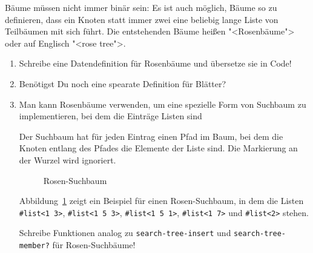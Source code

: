 \begin{aufgabe}
  Bäume müssen nicht immer binär sein: Es ist auch möglich, Bäume so
  zu definieren, dass ein Knoten statt immer zwei eine beliebig lange
  Liste von Teilbäumen mit sich führt.  Die entstehenden Bäume heißen
  "<Rosenbäume"> oder auf Englisch "<rose tree">.

  \begin{enumerate}
  \item Schreibe eine Datendefinition für Rosenbäume und übersetze sie
    in Code!
  \item Benötigst Du noch eine spearate Definition für Blätter?
  \item Man kann Rosenbäume verwenden, um eine spezielle Form von
    Suchbaum zu implementieren, bei dem die Einträge Listen sind

    Der Suchbaum hat für jeden Eintrag einen Pfad im Baum, bei dem die
    Knoten entlang des Pfades die Elemente der Liste sind.  Die
    Markierung an der Wurzel wird ignoriert.

    \begin{figure}[tb]
      \centering
{}
      
      \caption{Rosen-Suchbaum}
      \label{fig:rose-search-tree}
    \end{figure}

    Abbildung~\ref{fig:rose-search-tree} zeigt ein Beispiel für einen
    Rosen-Suchbaum, in dem die Listen \lstinline{#list<1 3>},
    \lstinline{#list<1 5 3>}, \lstinline{#list<1 5 1>},
    \lstinline{#list<1 7>} und \lstinline{#list<2>} stehen.

    Schreibe Funktionen analog zu \lstinline{search-tree-insert} und
    \lstinline{search-tree-member?} für Rosen-Suchbäume!
  \end{enumerate}
\end{aufgabe}

